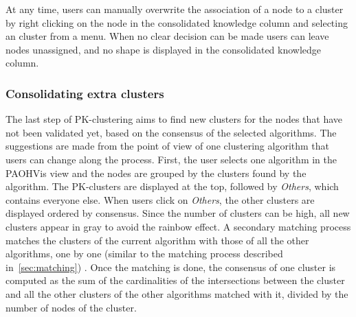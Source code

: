 \begin{description}[leftmargin=0pt,nosep]

\item [Direct tagging.] At any time, users can manually overwrite the association of a node to a cluster by right clicking on the node in the consolidated knowledge column and selecting an cluster from a menu.
When no clear decision can be made users can leave nodes unassigned, and no shape is displayed in the consolidated knowledge column.
\end{description}



\subsubsection{Consolidating extra clusters}

The last step of PK-clustering aims to find new clusters for the nodes that have not been validated yet, based on the consensus of the selected algorithms. The suggestions are made from the point of view of one clustering algorithm that users can change along the process.
First, the user selects one algorithm in the PAOHVis view and the nodes are grouped by the clusters found by the algorithm.
The PK-clusters are displayed at the top, followed by \emph{Others}, which contains everyone else. When users click on \emph{Others}, the other clusters are displayed ordered by consensus. Since the number of clusters can be high, all new clusters appear in gray to avoid the rainbow effect. A secondary matching process matches the clusters of the current algorithm with those of all the other algorithms, one by one (similar to the matching process described in~\autoref{sec:matching}) . Once the matching is done, the consensus of one cluster is computed as the sum of the cardinalities of the intersections between the cluster and all the other clusters of the other algorithms matched with it, divided by the number of nodes of the cluster.

